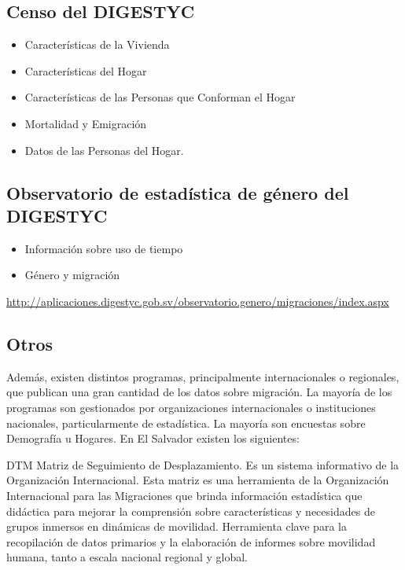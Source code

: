 \documentclass[
]{book}
\begin{document}
\hypertarget{censo-del-digestyc}{%
\subsection{Censo del DIGESTYC}\label{censo-del-digestyc}}

\begin{itemize}
\item
  Características de la Vivienda
\item
  Características del Hogar
\item
  Características de las Personas que Conforman el Hogar
\item
  Mortalidad y Emigración
\item
  Datos de las Personas del Hogar.
\end{itemize}

\hypertarget{observatorio-de-estaduxedstica-de-guxe9nero-del-digestyc}{%
\subsection{Observatorio de estadística de género del DIGESTYC}\label{observatorio-de-estaduxedstica-de-guxe9nero-del-digestyc}}

\begin{itemize}
\item
  Información sobre uso de tiempo
\item
  Género y migración
\end{itemize}

\url{http://aplicaciones.digestyc.gob.sv/observatorio.genero/migraciones/index.aspx}

\hypertarget{otros}{%
\subsection{Otros}\label{otros}}

Además, existen distintos programas, principalmente internacionales o regionales, que publican una gran cantidad de los datos sobre migración. La mayoría de los programas son gestionados por organizaciones internacionales o instituciones nacionales, particularmente de estadística. La mayoría son encuestas sobre Demografía u Hogares. En El Salvador existen los siguientes:

DTM Matriz de Seguimiento de Desplazamiento. Es un sistema informativo de la Organización Internacional. Esta matriz es una herramienta de la Organización Internacional para las Migraciones que brinda información estadística que didáctica para mejorar la comprensión sobre características y necesidades de grupos inmersos en dinámicas de movilidad. Herramienta clave para la recopilación de datos primarios y la elaboración de informes sobre movilidad humana, tanto a escala nacional regional y global.
\end{document}
